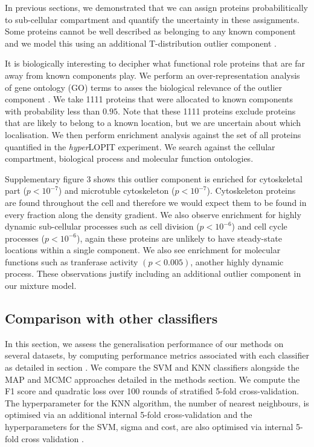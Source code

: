 \documentclass[12pt,english]{article}\usepackage[]{graphicx}\usepackage[]{color}
\begin{document}
In previous sections, we demonstrated that we can assign proteins
probabilitically to sub-cellular compartment and quantify the
uncertainty in these assignments. Some proteins cannot be well
described as belonging to any known component and we model this
using an additional T-distribution outlier component
{}.

It is biologically interesting to decipher what functional role
proteins that are far away from known components play. We perform an
over-representation analysis of gene ontology (GO) terms to asses the
biological relevance of the outlier component \citep{Boyle:2004,
  Yu:2012}. We take 1111 proteins that were allocated to known
components with probability less than $0.95$.  Note that these 1111
proteins exclude proteins that are likely to belong to a known
location, but we are uncertain about which localisation.  We then
perform enrichment analysis against the set of all proteins
quantified in the \textit{hyper}LOPIT experiment. We search against
the cellular compartment, biological process and molecular function
ontologies.

Supplementary figure 3 shows this outlier component
is enriched for cytoskeletal part ($p <10^{-7}$) and microtuble
cytoskeleton ($p <10^{-7}$). Cytoskeleton proteins are found
throughout the cell and therefore we would expect them to be found in
every fraction along the density gradient. We also observe enrichment
for highly dynamic sub-cellular processes such as cell division
($p <10^{-6}$) and cell cycle processes ($p <10^{-6}$), again these
proteins are unlikely to have steady-state locations within a single
component. We also see enrichment for molecular functions such as
tranferase activity $(p < 0.005)$, another highly dynamic
process. These observations justify including an additional outlier
component in our mixture model.

\subsection*{Comparison with other classifiers}

In this section, we assess the generalisation performance of our
methods on several datasets, by computing performance metrics
associated with each classifier as detailed in section
. We compare the SVM and KNN classifiers
alongside the MAP and MCMC approaches detailed in the methods
section. We compute the F1 score and quadratic loss over 100 rounds of
stratified 5-fold cross-validation. The hyperparameter for the KNN
algorithm, the number of nearest neighbours, is optimised via an
additional internal 5-fold cross-validation and the hyperparameters
for the SVM, sigma and cost, are also optimised via internal 5-fold
cross validation \citep{svm:2010}.
\end{document}
